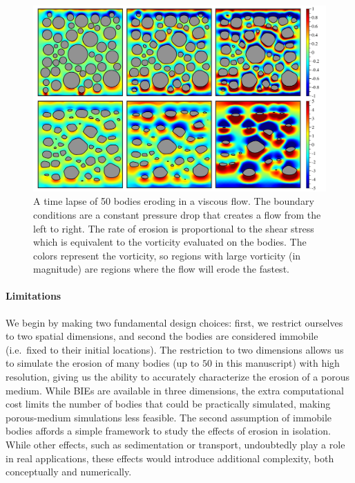 \documentclass[preprint, 10pt]{elsarticle}
\begin{document}
\begin{figure}%
\begin{center}
\includegraphics[width = 0.9 \textwidth]{./figs/50bod.pdf}
\caption{\label{fig:50bodies} A time lapse of 50 bodies eroding in a
viscous flow.  The boundary conditions are a constant pressure drop that
creates a flow from the left to right.  The rate of erosion is
proportional to the shear stress which is equivalent to the vorticity
evaluated on the bodies.  The colors represent the vorticity, so regions
with large vorticity (in magnitude) are regions where the flow will
erode the fastest.}
\end{center}
\end{figure}




\paragraph{Limitations} 

We begin by making two fundamental design choices: first, we restrict
ourselves to two spatial dimensions, and second the bodies are
considered immobile (i.e.~fixed to their initial locations). The
restriction to two dimensions allows us to simulate the erosion of many bodies
(up to $50$ in this manuscript) with high resolution, giving us the
ability to accurately characterize the erosion of a porous medium. While
BIEs are available in three dimensions, the extra computational cost limits the number of bodies that could be practically simulated, making porous-medium simulations less feasible. The second assumption of immobile bodies affords a simple framework to study the effects of erosion in isolation. While other effects, such as sedimentation or transport, undoubtedly play a role in real applications, these effects would introduce additional complexity, both conceptually and numerically. 
\end{document}
